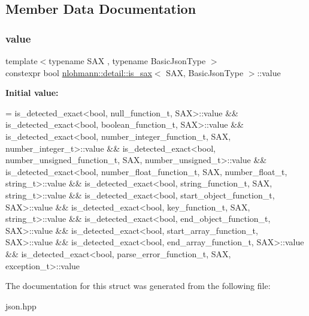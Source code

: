 \subsection{Member Data Documentation}
\mbox{\label{structnlohmann_1_1detail_1_1is__sax_a8ab7e51087000e948b4a2492257484dc}} 
\subsubsection{\texorpdfstring{value}{value}}
{\footnotesize\ttfamily template$<$typename S\+AX , typename Basic\+Json\+Type $>$ \\
constexpr bool \mbox{\hyperlink{structnlohmann_1_1detail_1_1is__sax}{nlohmann\+::detail\+::is\+\_\+sax}}$<$ S\+AX, Basic\+Json\+Type $>$\+::value\hspace{0.3cm}{\ttfamily [static]}}

{\bfseries Initial value\+:}
\begin{DoxyCode}
=
        is\_detected\_exact<bool, null\_function\_t, SAX>::value &&
        is\_detected\_exact<bool, boolean\_function\_t, SAX>::value &&
        is\_detected\_exact<bool, number\_integer\_function\_t, SAX,
        number\_integer\_t>::value &&
        is\_detected\_exact<bool, number\_unsigned\_function\_t, SAX,
        number\_unsigned\_t>::value &&
        is\_detected\_exact<bool, number\_float\_function\_t, SAX, number\_float\_t,
        string\_t>::value &&
        is\_detected\_exact<bool, string\_function\_t, SAX, string\_t>::value &&
        is\_detected\_exact<bool, start\_object\_function\_t, SAX>::value &&
        is\_detected\_exact<bool, key\_function\_t, SAX, string\_t>::value &&
        is\_detected\_exact<bool, end\_object\_function\_t, SAX>::value &&
        is\_detected\_exact<bool, start\_array\_function\_t, SAX>::value &&
        is\_detected\_exact<bool, end\_array\_function\_t, SAX>::value &&
        is\_detected\_exact<bool, parse\_error\_function\_t, SAX, exception\_t>::value
\end{DoxyCode}


The documentation for this struct was generated from the following file\+:\begin{DoxyCompactItemize}
\item 
json.\+hpp\end{DoxyCompactItemize}
